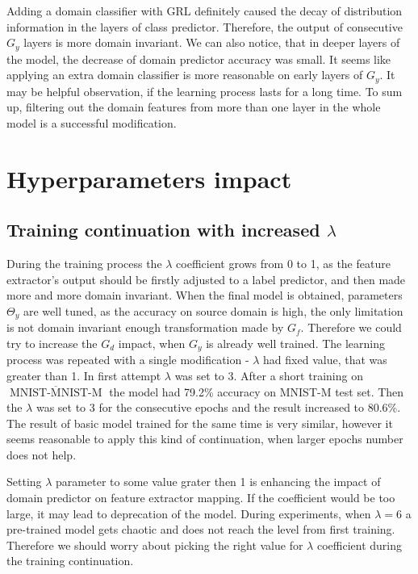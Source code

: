 \documentclass[shortabstract, inz, english]{iithesis}
\DeclareMathOperator{\mnistM}{MNIST-MNIST-M}
\newcommand{\mnist}{$\overline{\mnistM}$ }
\begin{document}
\par
Adding a domain classifier with GRL definitely caused the decay of distribution information in the layers of class predictor. Therefore, the output of consecutive $G_{y}$ layers is more domain invariant. We can also notice, that in deeper layers of the model, the decrease of domain predictor accuracy was small. It seems like applying an extra domain classifier is more reasonable on early layers of $G_{y}$. It may be helpful observation, if the learning process lasts for a long time. To sum up, filtering out the domain features from more than one layer in the whole model is a successful modification.


\section{Hyperparameters impact}

\subsection{Training continuation with increased $\lambda$}
During the training process the $\lambda$ coefficient grows from 0 to 1, as the feature extractor's output should be firstly adjusted to a label predictor, and then made more and more domain invariant. When the final model is obtained, parameters $\Theta_{y}$ are well tuned, as the accuracy on source domain is high, the only limitation is not domain invariant enough transformation made by $G_{f}$. Therefore we could try to increase the $G_{d}$ impact, when $G_{y}$ is already well trained. The learning process was repeated with a single modification - $\lambda$ had fixed value, that was greater than 1. In first attempt $\lambda$ was set to 3. After a short training on \mnist the model had 79.2\% accuracy on MNIST-M test set. Then the $\lambda$ was set to 3 for the consecutive epochs and the result increased to 80.6\%. The result of basic model trained for the same time is very similar, however it seems reasonable to apply this kind of continuation, when larger epochs number does not help.
\par
Setting $\lambda$ parameter to some value grater then 1 is enhancing the impact of domain predictor on feature extractor mapping. If the coefficient would be too large, it may lead to deprecation of the model. During experiments, when $\lambda = 6$ a pre-trained model gets chaotic and does not reach the level from first training. Therefore we should worry about picking the right value for $\lambda$ coefficient during the training continuation.
\end{document}
